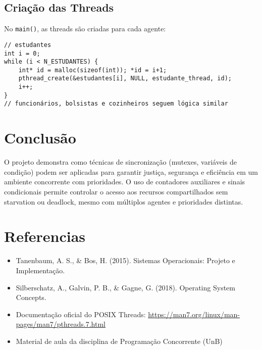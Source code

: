 \documentclass[10pt,a4paper]{article}
\begin{document}
\subsection{Criação das Threads}

No \texttt{main()}, as threads são criadas para cada agente:

\begin{verbatim}
// estudantes
int i = 0;
while (i < N_ESTUDANTES) {
    int* id = malloc(sizeof(int)); *id = i+1;
    pthread_create(&estudantes[i], NULL, estudante_thread, id);
    i++;
}
// funcionários, bolsistas e cozinheiros seguem lógica similar
\end{verbatim}

\section{Conclusão}

O projeto demonstra como técnicas de sincronização (mutexes, variáveis de condição) podem ser aplicadas para garantir justiça, segurança e eficiência em um ambiente concorrente com prioridades. O uso de contadores auxiliares e sinais condicionais permite controlar o acesso aos recursos compartilhados sem starvation ou deadlock, mesmo com múltiplos agentes e prioridades distintas.

\section{Referencias}

\begin{itemize}
    \item Tanenbaum, A. S., \& Bos, H. (2015). Sistemas Operacionais: Projeto e Implementação.
    \item Silberschatz, A., Galvin, P. B., \& Gagne, G. (2018). Operating System Concepts.
    \item Documentação oficial do POSIX Threads: \url{https://man7.org/linux/man-pages/man7/pthreads.7.html}
    \item Material de aula da disciplina de Programação Concorrente (UnB)
\end{itemize}
\end{document}
